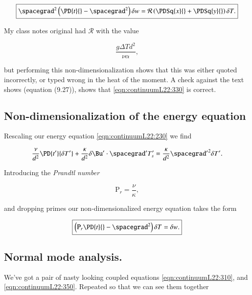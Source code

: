 \begin{equation}\label{eqn:continuumL22:310}
\boxed{
\spacegrad^2 \left( 
\PD{t}{} - \spacegrad^2 
\right)
\delta w
=
\mathcal{R} \left( 
\PDSq{x}{}
+\PDSq{y}{}
\right) \delta T.
}
\end{equation}

My class notes original had $\mathcal{R}$ with the value

\begin{equation*}
\frac{g \Delta T d^2}{\nu \alpha},
\end{equation*}

but performing this non-dimensionalization shows that this was either quoted incorrectly, or typed wrong in the heat of the moment.  A check against the text shows (equation (9.27)), shows that \ref{eqn:continuumL22:330} is correct.

\subsection{Non-dimensionalization of the energy equation}

Rescaling our energy equation \ref{eqn:continuumL22:230} we find

\begin{equation}\label{eqn:continuumL22:230b}
\frac{\nu}{d^2} \PD{t'}{\delta T'} + \frac{\kappa}{d^2} \delta \Bu' \cdot \spacegrad' T_s' = \frac{\kappa}{d^2} {\spacegrad'}^2 \delta T'.
\end{equation}

Introducing the \textit{Prandtl number}

\begin{equation}\label{eqn:continuumL22:370}
\text{P}_r = \frac{\nu}{\kappa},
\end{equation}

and dropping primes our non-dimensionalized energy equation takes the form

\begin{equation}\label{eqn:continuumL22:350}
\boxed{
\left( 
\text{P}_r
\PD{t}{} - \spacegrad^2 \right) \delta T = \delta w.
}
\end{equation}

\subsection{Normal mode analysis.}

We've got a pair of nasty looking coupled equations \ref{eqn:continuumL22:310}, and \ref{eqn:continuumL22:350}.  Repeated so that we can see them together

